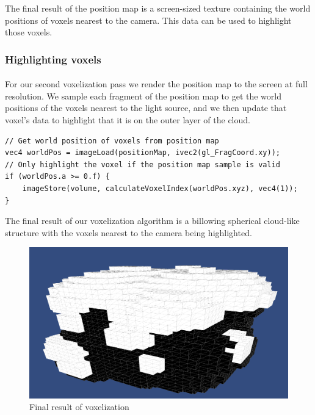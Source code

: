 The final result of the position map is a screen-sized texture containing the world positions of voxels nearest to the camera. This data can be used to highlight those voxels.

\subsubsection{Highlighting voxels}\paragraph{}
For our second voxelization pass we render the position map to the screen at full resolution. 
We sample each fragment of the position map to get the world positions of the voxels nearest to the light source, and we then update that voxel's data to highlight that it is on the outer layer of the cloud. 

\begin{lstlisting}[caption={second\_voxelize.glsl, 34}]
// Get world position of voxels from position map
vec4 worldPos = imageLoad(positionMap, ivec2(gl_FragCoord.xy));
// Only highlight the voxel if the position map sample is valid
if (worldPos.a >= 0.f) {
    imageStore(volume, calculateVoxelIndex(worldPos.xyz), vec4(1));
}
\end{lstlisting}

The final result of our voxelization algorithm is a billowing spherical cloud-like structure with the voxels nearest to the camera being highlighted. 

\begin{figure}[h]
\centering
\includegraphics[width=\textwidth]{../res/billowing.png}
\caption{Final result of voxelization}
\end{figure}

